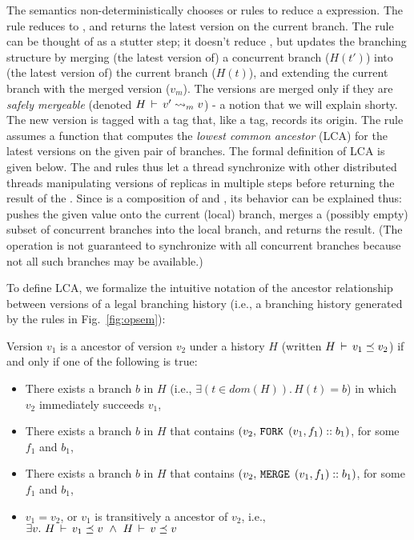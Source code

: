 The semantics non-deterministically chooses  or
 rules to reduce a  expression. The
 rule reduces  to \C{()}, and returns the
latest version on the current branch. The  rule
can be thought of as a stutter step; it doesn't reduce , but
updates the branching structure by merging (the latest version of) a
concurrent branch ($H(t')$) into (the latest version of) the current
branch ($H(t)$), and extending the current branch with the merged
version ($v_m$). The versions are merged only if they are \emph{safely
mergeable} (denoted $H\,\vdash\,v' \rightsquigarrow_m v$) - a notion that we will
explain shorty. The new version is tagged with a  tag that,
like a  tag, records its origin. The rule assumes a function
 that computes the \emph{lowest common ancestor} (LCA) for the
latest versions on the given pair of branches. The formal definition
of LCA is given below. The  and
 rules thus let a thread synchronize with other
distributed threads manipulating versions of replicas in multiple
steps before returning the result of the . Since  is a
composition of  and , its behavior can be explained
thus:  pushes the given value onto the current (local) branch,
merges a (possibly empty) subset of concurrent branches into the local
branch, and returns the result.  (The operation is not guaranteed to
synchronize with all concurrent branches because not all such branches
may be available.)

To define LCA, we formalize the intuitive notation of the ancestor
relationship between versions of a legal branching history (i.e., a
branching history generated by the rules in Fig.~\ref{fig:opsem}):

\begin{definition} 
Version $v_1$ is a ancestor of version $v_2$ under a history
$H$ (written $H\,\vdash\,v_1 \preceq v_2$) if and only if one of the
following is true:
\begin{itemize}
  \item There exists a branch $b$ in $H$ (i.e., $\exists(t\in
  dom(H)).\,H(t) = b$) in which $v_2$ immediately succeeds
  $v_1$,
  \item There exists a branch $b$ in $H$ that contains $(v_2,
  \,{\tt FORK}\,\; (v_1,f_1)::b_1)$, for some $f_1$ and $b_1$,
  \item There exists a branch $b$ in $H$ that contains
  $(v_2, \,{\tt MERGE}\,\;(v_1,f_1)::b_1)$, for some $f_1$ and $b_1$,
  \item $v_1 = v_2$, or $v_1$ is transitively a ancestor of
  $v_2$, i.e., $\exists v.~ H\,\vdash\,v_1 \preceq v ~\wedge~
  H\,\vdash\,v \preceq v$
\end{itemize}
\end{definition}


